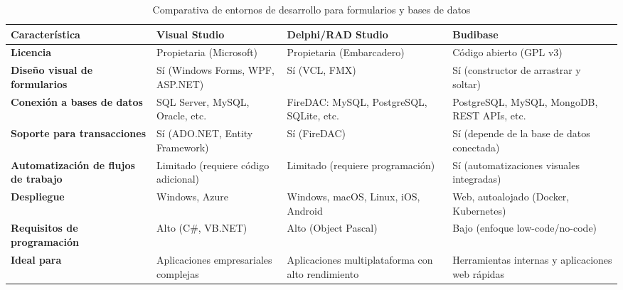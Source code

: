\documentclass[12pt, a4paper]{article}
\begin{document}
\newpage

\begin{table}[]
\centering
\caption{Comparativa de entornos de desarrollo para formularios y bases de datos}
\begin{tabular}{|p{3cm}|p{3.5cm}|p{3.5cm}|p{3.5cm}|}
\hline
\textbf{Característica} & \textbf{Visual Studio} & \textbf{Delphi/RAD Studio} & \textbf{Budibase} \\
\hline
\textbf{Licencia} & Propietaria (Microsoft) & Propietaria (Embarcadero) & Código abierto (GPL v3) \\
\hline
\textbf{Diseño visual de formularios} & Sí (Windows Forms, WPF, ASP.NET) & Sí (VCL, FMX) & Sí (constructor de arrastrar y soltar) \\
\hline
\textbf{Conexión a bases de datos} & SQL Server, MySQL, Oracle, etc. & FireDAC: MySQL, PostgreSQL, SQLite, etc. & PostgreSQL, MySQL, MongoDB, REST APIs, etc. \\
\hline
\textbf{Soporte para transacciones} & Sí (ADO.NET, Entity Framework) & Sí (FireDAC) & Sí (depende de la base de datos conectada) \\
\hline
\textbf{Automatización de flujos de trabajo} & Limitado (requiere código adicional) & Limitado (requiere programación) & Sí (automatizaciones visuales integradas) \\
\hline
\textbf{Despliegue} & Windows, Azure & Windows, macOS, Linux, iOS, Android & Web, autoalojado (Docker, Kubernetes) \\
\hline
\textbf{Requisitos de programación} & Alto (C\#, VB.NET) & Alto (Object Pascal) & Bajo (enfoque low-code/no-code) \\
\hline
\textbf{Ideal para} & Aplicaciones empresariales complejas & Aplicaciones multiplataforma con alto rendimiento & Herramientas internas y aplicaciones web rápidas \\
\hline
\end{tabular}
\end{table}
\end{document}
